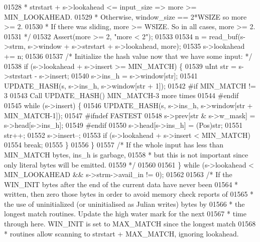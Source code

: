 \begin{DoxyCode}
{{{{{01528 \textcolor{comment}{         *   strstart + s->lookahead <= input\_size => more >= MIN\_LOOKAHEAD.}
01529 \textcolor{comment}{         * Otherwise, window\_size == 2*WSIZE so more >= 2.}
01530 \textcolor{comment}{         * If there was sliding, more >= WSIZE. So in all cases, more >= 2.}
01531 \textcolor{comment}{         */}
01532         Assert(more >= 2, \textcolor{stringliteral}{"more < 2"});
01533 
01534         n = read\_buf(s->strm, s->window + s->strstart + s->lookahead, more);
01535         s->lookahead += n;
01536 
01537         \textcolor{comment}{/* Initialize the hash value now that we have some input: */}
01538         \textcolor{keywordflow}{if} (s->lookahead + s->insert >= MIN\_MATCH) \{
01539             uInt str = s->strstart - s->insert;
01540             s->ins\_h = s->window[str];
01541             UPDATE\_HASH(s, s->ins\_h, s->window[str + 1]);
01542 \textcolor{preprocessor}{#if MIN\_MATCH != 3}
01543             Call UPDATE\_HASH() MIN\_MATCH-3 more times
01544 \textcolor{preprocessor}{#endif}
01545             \textcolor{keywordflow}{while} (s->insert) \{
01546                 UPDATE\_HASH(s, s->ins\_h, s->window[str + MIN\_MATCH-1]);
01547 \textcolor{preprocessor}{#ifndef FASTEST}
01548                 s->prev[str & s->w\_mask] = s->head[s->ins\_h];
01549 \textcolor{preprocessor}{#endif}
01550                 s->head[s->ins\_h] = (Pos)str;
01551                 str++;
01552                 s->insert--;
01553                 \textcolor{keywordflow}{if} (s->lookahead + s->insert < MIN\_MATCH)
01554                     \textcolor{keywordflow}{break};
01555             \}
01556         \}
01557         \textcolor{comment}{/* If the whole input has less than MIN\_MATCH bytes, ins\_h is garbage,}
01558 \textcolor{comment}{         * but this is not important since only literal bytes will be emitted.}
01559 \textcolor{comment}{         */}
01560 
01561     \} \textcolor{keywordflow}{while} (s->lookahead < MIN\_LOOKAHEAD && s->strm->avail\_in != 0);
01562 
01563     \textcolor{comment}{/* If the WIN\_INIT bytes after the end of the current data have never been}
01564 \textcolor{comment}{     * written, then zero those bytes in order to avoid memory check reports of}
01565 \textcolor{comment}{     * the use of uninitialized (or uninitialised as Julian writes) bytes by}
01566 \textcolor{comment}{     * the longest match routines.  Update the high water mark for the next}
01567 \textcolor{comment}{     * time through here.  WIN\_INIT is set to MAX\_MATCH since the longest match}
01568 \textcolor{comment}{     * routines allow scanning to strstart + MAX\_MATCH, ignoring lookahead.}
}}}}}
\end{DoxyCode}
